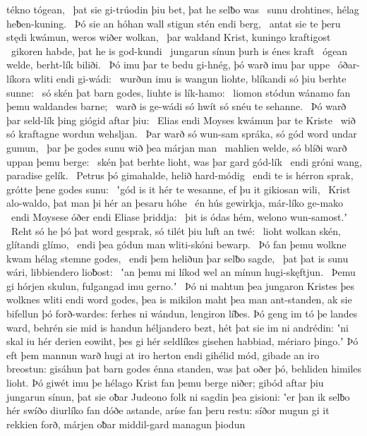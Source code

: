 tékno tógean, \hld\ þat sie gi-trúodin þiu bet,
þat he selƀo was \hld\ sunu drohtines,
hélag heƀen-kuning. \hld\ Þó sie an hóhan wall
stigun stén endi berg, \hld\ antat sie te þeru stędi kwámun,
weros wiðer wolkan, \hld\ þar waldand Krist,
kuningo kraftigost \hld\ gikoren habde,
þat he is god-kundi \hld\ jungarun sínun
þurh is énes kraft \hld\ ógean welde,
berht-lík biliði. \hld\ Þó imu þar te bedu gi-hnég,
þó warð imu þar uppe \hld\ óðar-líkora
wliti endi gi-wádi: \hld\ wurðun imu is wangun liohte,
blíkandi só þiu berhte sunne: \hld\ só skén þat barn godes,
liuhte is lík-hamo: \hld\ liomon stódun
wánamo fan þemu waldandes barne; \hld\ warð is ge-wádi só hwít
só snéu te sehanne. \hld\ Þó warð þar seld-lík þing
giógid aftar þiu: \hld\ Elias endi Moyses
kwámun þar te Kriste \hld\ wið só kraftagne
wordun wehsljan. \hld\ Þar warð só wun-sam spráka,
só gód word undar gumun, \hld\ þar þe godes sunu
wið þea márjan man \hld\ mahlien welde,
só blíði warð uppan þemu berge: \hld\ skén þat berhte lioht,
was þar gard gód-lík \hld\ endi gróni wang,
paradise gelík. \hld\ Petrus þó gimahalde,
helið hard-módig \hld\ endi te is hérron sprak,
grótte þene godes sunu: \hld\ ʽgód is it hér te wesanne,
ef þu it gikiosan wili, \hld\ Krist alo-waldo,
þat man þi hér an þesaru hóhe \hld\ én hús gewirkja,
már-líko ge-mako \hld\ endi Moysese óðer
endi Eliase þriddja: \hld\ þit is ódas hém,
welono wun-samost.ʼ \hld\ Reht só he þó þat word gesprak,
só tilét þiu luft an twé: \hld\ lioht wolkan skén,
glítandi glímo, \hld\ endi þea gódun man
wliti-skóni bewarp. \hld\ Þó fan þemu wolkne kwam
hélag stemne godes, \hld\ endi þem heliðun þar
selƀo sagde, \hld\ þat þat is sunu wári,
libbiendero lioƀost: \hld\ ʽan þemu mi líkod wel
an mínun hugi-skęftjun. \hld\ Þemu gi hórjen skulun,
fulgangad imu gerno.ʼ \hld\ Þó ni mahtun þea jungaron Kristes
þes wolknes wliti endi word godes,
þea is mikilon maht þea man ant-standen,
ak sie bifellun þó forð-wardes: ferhes ni wándun,
lengiron líƀes. Þó geng im tó þe landes ward,
behrén sie mid is handun héljandero bezt,
hét þat sie im ni andrédin: ʽni skal iu hér derien eowiht,
þes gi hér seldlíkes gisehen habbiad,
mériaro þingo.ʼ Þó eft þem mannun warð
hugi at iro herton endi gihélid mód,
gibade an iro breostun: gisáhun þat barn godes
énna standen, was þat oðer þó,
behliden himiles lioht. Þó giwét imu þe hélago Krist
fan þemu berge niðer; gibód aftar þiu
jungarun sínun, þat sie oƀar Judeono folk
ni sagdin þea gisioni: ʽer þan ik selƀo hér
swíðo diurlíko fan dóðe astande,
aríse fan þeru restu: síðor mugun gi it rekkien forð,
márjen oƀar middil-gard managun þiodun

